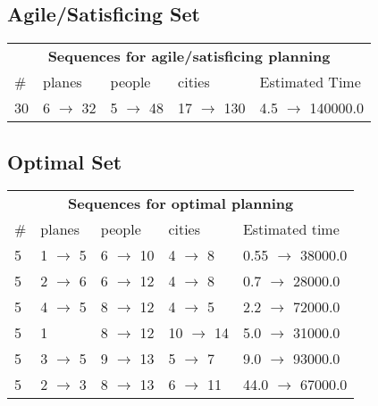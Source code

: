 \documentclass{article}
\begin{document}
                         \subsection*{Agile/Satisficing Set}

                        \begin{center}
                        \begin{tabular}{@{}l|l|l|l|l@{}}
                        \multicolumn{5}{c}{\bf \large Sequences for agile/satisficing planning}\\
                        \# & planes & people & cities & Estimated Time\\\midrule
                        30&6 $\rightarrow$ 32&5 $\rightarrow$ 48&17 $\rightarrow$ 130&4.5 $\rightarrow$ 140000.0
                        \end{tabular}
                        \end{center}
                    
                            \subsection*{Optimal Set}

                            \begin{center}
                            \begin{tabular}{@{}l|l|l|l|l@{}}
                            \multicolumn{5}{c}{\bf \large Sequences for optimal planning}\\
                            \# & planes & people & cities & Estimated time\\\midrule
                            5&1 $\rightarrow$ 5&6 $\rightarrow$ 10&4 $\rightarrow$ 8&0.55 $\rightarrow$ 38000.0\\
5&2 $\rightarrow$ 6&6 $\rightarrow$ 12&4 $\rightarrow$ 8&0.7 $\rightarrow$ 28000.0\\
5&4 $\rightarrow$ 5&8 $\rightarrow$ 12&4 $\rightarrow$ 5&2.2 $\rightarrow$ 72000.0\\
5&1&8 $\rightarrow$ 12&10 $\rightarrow$ 14&5.0 $\rightarrow$ 31000.0\\
5&3 $\rightarrow$ 5&9 $\rightarrow$ 13&5 $\rightarrow$ 7&9.0 $\rightarrow$ 93000.0\\
5&2 $\rightarrow$ 3&8 $\rightarrow$ 13&6 $\rightarrow$ 11&44.0 $\rightarrow$ 67000.0
                            \end{tabular}
                            \end{center}
                    
\end{document}
